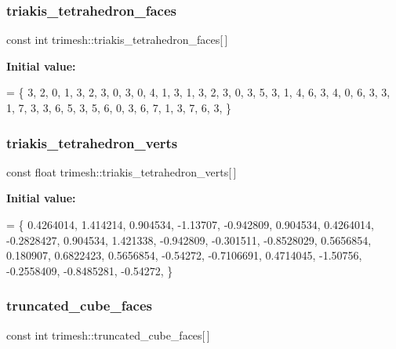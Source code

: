 \subsubsection{\texorpdfstring{triakis\+\_\+tetrahedron\+\_\+faces}{triakis\_tetrahedron\_faces}}
{\footnotesize\ttfamily const int trimesh\+::triakis\+\_\+tetrahedron\+\_\+faces\mbox{[}$\,$\mbox{]}\hspace{0.3cm}{\ttfamily [static]}}

{\bfseries Initial value\+:}
\begin{DoxyCode}
= \{
    3, 2, 0, 1,
    3, 2, 3, 0,
    3, 0, 4, 1,
    3, 1, 3, 2,
    3, 0, 3, 5,
    3, 1, 4, 6,
    3, 4, 0, 6,
    3, 3, 1, 7,
    3, 3, 6, 5,
    3, 5, 6, 0,
    3, 6, 7, 1,
    3, 7, 6, 3,
\}
\end{DoxyCode}
\mbox{\label{namespacetrimesh_a19fb6122385fea95f83873a8f40e88c8}} 
\subsubsection{\texorpdfstring{triakis\+\_\+tetrahedron\+\_\+verts}{triakis\_tetrahedron\_verts}}
{\footnotesize\ttfamily const float trimesh\+::triakis\+\_\+tetrahedron\+\_\+verts\mbox{[}$\,$\mbox{]}\hspace{0.3cm}{\ttfamily [static]}}

{\bfseries Initial value\+:}
\begin{DoxyCode}
= \{
    0.4264014, 1.414214, 0.904534,
    -1.13707, -0.942809, 0.904534,
    0.4264014, -0.2828427, 0.904534,
    1.421338, -0.942809, -0.301511,
    -0.8528029, 0.5656854, 0.180907,
    0.6822423, 0.5656854, -0.54272,
    -0.7106691, 0.4714045, -1.50756,
    -0.2558409, -0.8485281, -0.54272,
\}
\end{DoxyCode}
\mbox{\label{namespacetrimesh_a4cbf810c8c69a9eb024850085bcc3cec}} 
\subsubsection{\texorpdfstring{truncated\+\_\+cube\+\_\+faces}{truncated\_cube\_faces}}
{\footnotesize\ttfamily const int trimesh\+::truncated\+\_\+cube\+\_\+faces\mbox{[}$\,$\mbox{]}\hspace{0.3cm}{\ttfamily [static]}}

